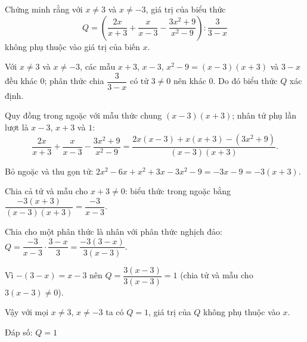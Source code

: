 \begin{problem}[8DS-PS-008]
Chứng minh rằng với $x \neq 3$ và $x \neq -3$, giá trị của biểu thức
\[ Q = \left(\dfrac{2x}{x + 3} + \dfrac{x}{x - 3} - \dfrac{3x^2 + 9}{x^2 - 9}\right) : \dfrac{3}{3 - x} \]
không phụ thuộc vào giá trị của biến $x$.

\begin{solution}
Với $x \neq 3$ và $x \neq -3$, các mẫu $x + 3$, $x - 3$, $x^2 - 9 = (x - 3)(x + 3)$ và $3 - x$ đều khác $0$; phân thức chia $\dfrac{3}{3 - x}$ có tử $3 \neq 0$ nên khác $0$. Do đó biểu thức $Q$ xác định.

Quy đồng trong ngoặc với mẫu thức chung $(x - 3)(x + 3)$; nhân tử phụ lần lượt là $x - 3$, $x + 3$ và $1$:
\[ \dfrac{2x}{x + 3} + \dfrac{x}{x - 3} - \dfrac{3x^2 + 9}{x^2 - 9} = \dfrac{2x(x - 3) + x(x + 3) - (3x^2 + 9)}{(x - 3)(x + 3)}. \]

Bỏ ngoặc và thu gọn tử: $2x^2 - 6x + x^2 + 3x - 3x^2 - 9 = -3x - 9 = -3(x + 3)$.

Chia cả tử và mẫu cho $x + 3 \neq 0$: biểu thức trong ngoặc bằng $\dfrac{-3(x + 3)}{(x - 3)(x + 3)} = \dfrac{-3}{x - 3}$.

Chia cho một phân thức là nhân với phân thức nghịch đảo: $Q = \dfrac{-3}{x - 3} \cdot \dfrac{3 - x}{3} = \dfrac{-3(3 - x)}{3(x - 3)}$.

Vì $-(3 - x) = x - 3$ nên $Q = \dfrac{3(x - 3)}{3(x - 3)} = 1$ (chia tử và mẫu cho $3(x - 3) \neq 0$).

Vậy với mọi $x \neq 3$, $x \neq -3$ ta có $Q = 1$, giá trị của $Q$ không phụ thuộc vào $x$.

Đáp số: $\boxed{Q = 1}$
\end{solution}
\end{problem}

